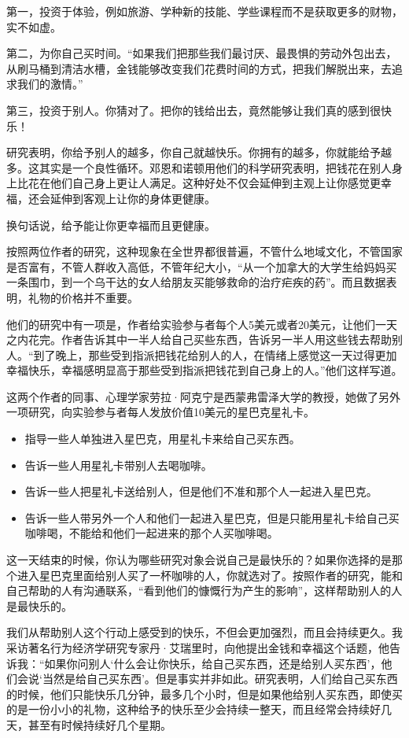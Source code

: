 第一，投资于体验，例如旅游、学种新的技能、学些课程而不是获取更多的财物，实不如虚。

第二，为你自己买时间。“如果我们把那些我们最讨厌、最畏惧的劳动外包出去，从刷马桶到清洁水槽，金钱能够改变我们花费时间的方式，把我们解脱出来，去追求我们的激情。”

第三，投资于别人。你猜对了。把你的钱给出去，竟然能够让我们真的感到很快乐！

研究表明，你给予别人的越多，你自己就越快乐。你拥有的越多，你就能给予越多。这其实是一个良性循环。邓恩和诺顿用他们的科学研究表明，把钱花在别人身上比花在他们自己身上更让人满足。这种好处不仅会延伸到主观上让你感觉更幸福，还会延伸到客观上让你的身体更健康。

换句话说，给予能让你更幸福而且更健康。

按照两位作者的研究，这种现象在全世界都很普遍，不管什么地域文化，不管国家是否富有，不管人群收入高低，不管年纪大小，“从一个加拿大的大学生给妈妈买一条围巾，到一个乌干达的女人给朋友买能够救命的治疗疟疾的药”。而且数据表明，礼物的价格并不重要。

他们的研究中有一项是，作者给实验参与者每个人5美元或者20美元，让他们一天之内花完。作者告诉其中一半人给自己买些东西，告诉另一半人用这些钱去帮助别人。“到了晚上，那些受到指派把钱花给别人的人，在情绪上感觉这一天过得更加幸福快乐，幸福感明显高于那些受到指派把钱花到自己身上的人。”他们这样写道。

这两个作者的同事、心理学家劳拉·阿克宁是西蒙弗雷泽大学的教授，她做了另外一项研究，向实验参与者每人发放价值10美元的星巴克星礼卡。

\begin{itemize}
\item 指导一些人单独进入星巴克，用星礼卡来给自己买东西。
\item 告诉一些人用星礼卡带别人去喝咖啡。
\item 告诉一些人把星礼卡送给别人，但是他们不准和那个人一起进入星巴克。
\item 告诉一些人带另外一个人和他们一起进入星巴克，但是只能用星礼卡给自己买咖啡喝，不能给和他们一起进来的那个人买咖啡喝。
\end{itemize}

这一天结束的时候，你认为哪些研究对象会说自己是最快乐的？如果你选择的是那个进入星巴克里面给别人买了一杯咖啡的人，你就选对了。按照作者的研究，能和自己帮助的人有沟通联系，“看到他们的慷慨行为产生的影响”，这样帮助别人的人是最快乐的。

我们从帮助别人这个行动上感受到的快乐，不但会更加强烈，而且会持续更久。我采访著名行为经济学研究专家丹·艾瑞里时，向他提出金钱和幸福这个话题，他告诉我：“如果你问别人‘什么会让你快乐，给自己买东西，还是给别人买东西’，他们会说‘当然是给自己买东西’。但是事实并非如此。研究表明，人们给自己买东西的时候，他们只能快乐几分钟，最多几个小时，但是如果他给别人买东西，即使买的是一份小小的礼物，这种给予的快乐至少会持续一整天，而且经常会持续好几天，甚至有时候持续好几个星期。

